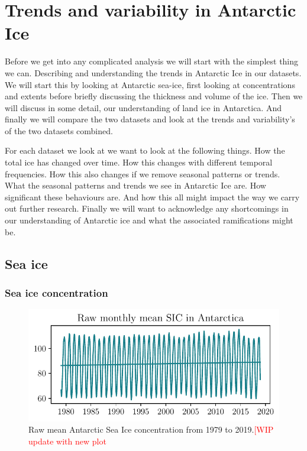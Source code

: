 \documentclass[../main.tex]{subfiles}
\begin{document}
\chapter{Trends and variability in Antarctic Ice}
\label{chap:ice_behaviour}
Before we get into any complicated analysis we will start with the simplest thing we can. Describing and understanding the trends in Antarctic Ice in our datasets. We will start this by looking at Antarctic sea-ice, first looking at concentrations and extents before briefly discussing the thickness and volume of the ice. Then we will discuss in some detail, our understanding of land ice in Antarctica. And finally we will compare the two datasets and look at the trends and variability's of the two datasets combined.

For each dataset we look at we want to look at the following things. How the total ice has changed over time. How this changes with different temporal frequencies. How this also changes if we remove seasonal patterns or trends. What the seasonal patterns and trends we see in Antarctic Ice are. How significant these behaviours are. And how this all might impact the way we carry out further research. Finally we will want to acknowledge any shortcomings in our understanding of Antarctic ice and what the associated ramifications might be.



\section{Sea ice}
\subsection{Sea ice concentration}
\begin{figure}[H]
    \centering
    \includegraphics{images/timeseries/SIC/raw_monthly_1_raw.pdf}
    \caption{Raw mean Antarctic Sea Ice concentration from 1979 to 2019.\textcolor{red}{[WIP update with new plot}}
    \label{fig:sic_timeseries}
\end{figure}
\end{document}

